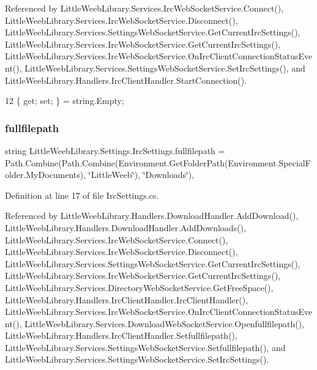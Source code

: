 Referenced by Little\+Weeb\+Library.\+Services.\+Irc\+Web\+Socket\+Service.\+Connect(), Little\+Weeb\+Library.\+Services.\+Irc\+Web\+Socket\+Service.\+Disconnect(), Little\+Weeb\+Library.\+Services.\+Settings\+Web\+Socket\+Service.\+Get\+Current\+Irc\+Settings(), Little\+Weeb\+Library.\+Services.\+Irc\+Web\+Socket\+Service.\+Get\+Current\+Irc\+Settings(), Little\+Weeb\+Library.\+Services.\+Irc\+Web\+Socket\+Service.\+On\+Irc\+Client\+Connection\+Status\+Event(), Little\+Weeb\+Library.\+Services.\+Settings\+Web\+Socket\+Service.\+Set\+Irc\+Settings(), and Little\+Weeb\+Library.\+Handlers.\+Irc\+Client\+Handler.\+Start\+Connection().


\begin{DoxyCode}
12 \{ \textcolor{keyword}{get}; \textcolor{keyword}{set}; \} = \textcolor{keywordtype}{string}.Empty;
\end{DoxyCode}
\mbox{\label{class_little_weeb_library_1_1_settings_1_1_irc_settings_ad1f67b09e16ba2b5fed2dcdefeac8e1a}} 
\subsubsection{\texorpdfstring{fullfilepath}{fullfilepath}}
{\footnotesize\ttfamily string Little\+Weeb\+Library.\+Settings.\+Irc\+Settings.\+fullfilepath = Path.\+Combine(Path.\+Combine(Environment.\+Get\+Folder\+Path(Environment.\+Special\+Folder.\+My\+Documents), \char`\"{}Little\+Weeb\char`\"{}), \char`\"{}Downloads\char`\"{})\hspace{0.3cm}{\ttfamily [get]}, {\ttfamily [set]}}



Definition at line 17 of file Irc\+Settings.\+cs.



Referenced by Little\+Weeb\+Library.\+Handlers.\+Download\+Handler.\+Add\+Download(), Little\+Weeb\+Library.\+Handlers.\+Download\+Handler.\+Add\+Downloads(), Little\+Weeb\+Library.\+Services.\+Irc\+Web\+Socket\+Service.\+Connect(), Little\+Weeb\+Library.\+Services.\+Irc\+Web\+Socket\+Service.\+Disconnect(), Little\+Weeb\+Library.\+Services.\+Settings\+Web\+Socket\+Service.\+Get\+Current\+Irc\+Settings(), Little\+Weeb\+Library.\+Services.\+Irc\+Web\+Socket\+Service.\+Get\+Current\+Irc\+Settings(), Little\+Weeb\+Library.\+Services.\+Directory\+Web\+Socket\+Service.\+Get\+Free\+Space(), Little\+Weeb\+Library.\+Handlers.\+Irc\+Client\+Handler.\+Irc\+Client\+Handler(), Little\+Weeb\+Library.\+Services.\+Irc\+Web\+Socket\+Service.\+On\+Irc\+Client\+Connection\+Status\+Event(), Little\+Weeb\+Library.\+Services.\+Download\+Web\+Socket\+Service.\+Openfullfilepath(), Little\+Weeb\+Library.\+Handlers.\+Irc\+Client\+Handler.\+Setfullfilepath(), Little\+Weeb\+Library.\+Services.\+Settings\+Web\+Socket\+Service.\+Setfullfilepath(), and Little\+Weeb\+Library.\+Services.\+Settings\+Web\+Socket\+Service.\+Set\+Irc\+Settings().


